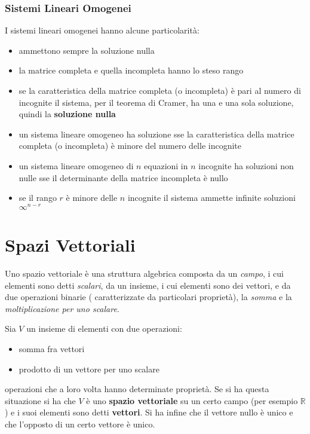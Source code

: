 \documentclass[a4paper,12pt, oneside]{book}
\begin{document}
\subsection{Sistemi Lineari Omogenei}
I sistemi lineari omogenei hanno alcune particolarità:
\begin{itemize}
\item ammettono sempre la soluzione nulla
\item la matrice completa e quella incompleta hanno lo steso rango
\item se la caratteristica della matrice completa (o incompleta) è pari al numero di incognite il sistema, per il teorema di Cramer, ha una e una sola soluzione, quindi la \textbf{soluzione nulla}
\item un sistema lineare omogeneo ha soluzione sse la caratteristica della matrice completa (o incompleta) è minore del numero delle incognite
\item un sistema lineare omogeneo di $n$ equazioni in $n$ incognite ha soluzioni non nulle sse il determinante della matrice incompleta è nullo
\item se il rango $r$ è minore delle $n$ incognite il sistema ammette infinite soluzioni $\infty^{n-r}$
\end{itemize}
\chapter{Spazi Vettoriali}
Uno spazio  vettoriale è una struttura algebrica composta da un \textit{campo}, i cui elementi sono detti \textit{scalari}, da un insieme, i cui elementi sono dei vettori, e da due operazioni binarie ( caratterizzate da particolari proprietà), la \textit{somma} e la \textit{moltiplicazione per uno scalare}.
\begin{definizione}
Sia $V$ un insieme di elementi con due operazioni: 
\begin{itemize}
\item somma fra vettori
\item prodotto di un vettore per uno scalare
\end{itemize}
operazioni che a loro volta hanno determinate proprietà. Se si ha questa situazione si ha che $V$ è uno \textbf{spazio vettoriale} su un certo campo (per esempio $\mathbb{R}$) e i suoi elementi sono detti \textbf{vettori}. Si ha infine che il vettore nullo è unico e che l'opposto di un certo vettore è unico.
\end{definizione}
\end{document}
